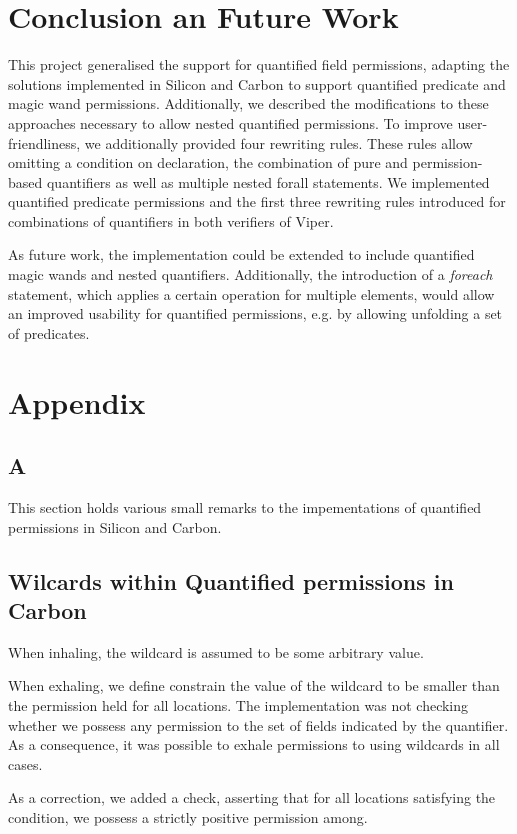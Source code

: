 \documentclass[12pt]{article}
\begin{document}
\section{Conclusion an Future Work}
This project generalised the support for quantified field permissions, adapting the solutions implemented in Silicon and Carbon to support quantified predicate and magic wand permissions. Additionally, we described the modifications to these approaches necessary to allow nested quantified permissions. To improve user-friendliness, we additionally provided four rewriting rules. These rules allow omitting a condition on declaration, the combination of pure and permission-based quantifiers as well as multiple nested forall statements. We implemented quantified predicate permissions and the first three rewriting rules introduced for combinations of quantifiers in both verifiers of Viper.

As future work, the implementation could be extended to include quantified magic wands and nested quantifiers. Additionally, the introduction of a \textit{foreach} statement, which applies a certain operation for multiple elements, would allow an improved usability for quantified permissions, e.g. by allowing unfolding a set of predicates.



\newpage
\section{Appendix}
\subsection{A}
This section holds various small remarks to the impementations of quantified permissions in Silicon and Carbon.

\subsection{Wilcards within Quantified permissions in Carbon}
When inhaling, the wildcard is assumed to be some arbitrary value. 

When exhaling, we define constrain the value of the wildcard to be smaller than the permission held for all locations. The implementation was not checking whether we possess any permission to the set of fields indicated by the quantifier. As a consequence, it was possible to exhale permissions to using wildcards in all cases.

As a correction, we added a check, asserting that for all locations satisfying the condition, we possess a strictly positive permission among.
\end{document}

